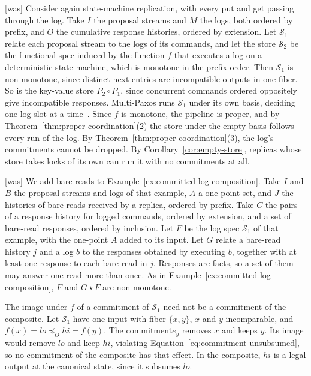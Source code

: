 \documentclass[sigconf]{cidr-2027}
\theoremstyle{remark}
\newcommand{\OutputOrd}{\preceq_O}
\newcommand{\commitment}{commitment\xspace}
\newcommand{\commitments}{commitments\xspace}
\newcommand{\Spec}{\mathcal{S}}
\begin{document}
{\footnotesize\color{black!50}\noindent\textsf{[was]} Consider again state-machine replication, with every put and get passing
through the log.  Take $I$ the proposal streams and $M$ the logs, both ordered
by prefix, and $O$ the cumulative response histories, ordered by extension.
Let $\Spec_1$ relate each proposal stream to the logs of its commands, and let
the store $\Spec_2$ be the functional spec induced by the function
$f$ that executes a log on a
deterministic state machine, which is monotone in the prefix order.  Then
$\Spec_1$ is non-monotone, since distinct next entries are incompatible
outputs in one fiber.  So is the key-value store $P_2\circ P_1$, since
concurrent commands ordered oppositely give incompatible responses.
Multi-Paxos runs $\Spec_1$ under its own basis, deciding one log slot at a
time~\cite{schneider1990smr,lamport2001paxos}.  Since $f$ is monotone, the
pipeline is proper, and by Theorem~\ref{thm:proper-coordination}(2) the store
under the empty basis follows every run of the log.  By
Theorem~\ref{thm:proper-coordination}(3), the log's \commitments cannot be
dropped.  By Corollary~\ref{cor:empty-store}, replicas whose store takes locks
of its own can run it with no \commitments at all.\par}



{\footnotesize\color{black!50}\noindent\textsf{[was]} We add bare reads to Example~\ref{ex:committed-log-composition}.  Take $I$
and $B$ the proposal streams and logs of that example, $A$ a one-point set,
and $J$ the histories of bare reads received by a replica, ordered by prefix.
Take $C$ the pairs of a response history for logged commands, ordered by
extension, and a set of bare-read responses, ordered by inclusion.  Let $F$ be
the log spec $\Spec_1$ of that example, with the one-point $A$
added to its input.  Let $G$ relate a bare-read history $j$ and a log $b$ to
the responses obtained by executing $b$, together with at least one response to
each bare read in $j$.  Responses are facts, so a set of them may answer one
read more than once.  As in Example~\ref{ex:committed-log-composition}, $F$
and $G\star F$ are non-monotone.\par}

\color{blue!70!black}The image under $f$ of a \commitment of $\Spec_1$ need not be a \commitment
of the composite.  Let $\Spec_1$
have one input with fiber $\{x,y\}$, $x$ and $y$ incomparable, and
$f(x)=\mathit{lo}\OutputOrd\mathit{hi}=f(y)$.  The \commitment $e_y$ removes $x$
and keeps $y$.  Its image would remove $\mathit{lo}$ and keep $\mathit{hi}$,
violating Equation~\ref{eq:commitment-unsubsumed}, so no \commitment of the
composite has that effect.  In the composite, $\mathit{hi}$ is a legal output
at the canonical state, since it subsumes $\mathit{lo}$.\color{black}
\end{document}
